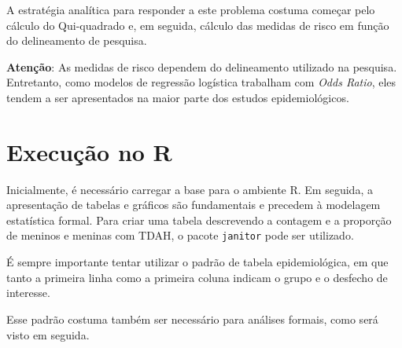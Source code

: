\documentclass[
]{book}
\newenvironment{Shaded}{\begin{snugshade}}{\end{snugshade}}
\newcommand{\DecValTok}[1]{\textcolor[rgb]{0.00,0.00,0.81}{#1}}
\newcommand{\KeywordTok}[1]{\textcolor[rgb]{0.13,0.29,0.53}{\textbf{#1}}}
\newcommand{\NormalTok}[1]{#1}
\newcommand{\OperatorTok}[1]{\textcolor[rgb]{0.81,0.36,0.00}{\textbf{#1}}}
\newcommand{\StringTok}[1]{\textcolor[rgb]{0.31,0.60,0.02}{#1}}
\begin{document}
A estratégia analítica para responder a este problema costuma começar pelo cálculo do Qui-quadrado e, em seguida, cálculo das medidas de risco em função do delineamento de pesquisa.

\textbf{Atenção}: As medidas de risco dependem do delineamento utilizado na pesquisa. Entretanto, como modelos de regressão logística trabalham com \emph{Odds Ratio}, eles tendem a ser apresentados na maior parte dos estudos epidemiológicos.

\hypertarget{execuuxe7uxe3o-no-r-2}{%
\section{Execução no R}\label{execuuxe7uxe3o-no-r-2}}

Inicialmente, é necessário carregar a base para o ambiente R. Em seguida, a apresentação de tabelas e gráficos são fundamentais e precedem à modelagem estatística formal. Para criar uma tabela descrevendo a contagem e a proporção de meninos e meninas com TDAH, o pacote \texttt{janitor} pode ser utilizado.

É sempre importante tentar utilizar o padrão de tabela epidemiológica, em que tanto a primeira linha como a primeira coluna indicam o grupo e o desfecho de interesse.

Esse padrão costuma também ser necessário para análises formais, como será visto em seguida.

\begin{Shaded}
\end{Shaded}
\end{document}
